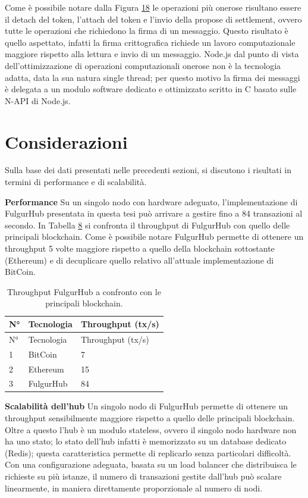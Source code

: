 \documentclass[12pt,italian,]{book}
\begin{document}
Come è possibile notare dalla Figura \protect\hyperlink{profiling-offchain}{18} le operazioni più onerose risultano essere il detach del token, l'attach del token e l'invio della propose di settlement, ovvero tutte le operazioni che richiedono la firma di un messaggio. Questo risultato è quello aspettato, infatti la firma crittografica richiede un lavoro computazionale maggiore rispetto alla lettura e invio di un messaggio. Node.js dal punto di vista dell'ottimizzazione di operazioni computazionali onerose non è la tecnologia adatta, data la sua natura single thread; per questo motivo la firma dei messaggi è delegata a un modulo software dedicato e ottimizzato scritto in C basato sulle N-API di Node.js.

\hypertarget{considerazioni}{%
\section{Considerazioni}\label{considerazioni}}

Sulla base dei dati presentati nelle precedenti sezioni, si discutono i risultati in termini di performance e di scalabilità.

\textbf{\textbf{Performance}} Su un singolo nodo con hardware adeguato, l'implementazione di FulgurHub presentata in questa tesi può arrivare a gestire fino a 84 transazioni al secondo. In Tabella \protect\hyperlink{fulgurhub_confronto}{8} si confronta il throughput di FulgurHub con quello delle principali blockchain. Come è possibile notare FulgurHub permette di ottenere un throughput 5 volte maggiore rispetto a quello della blockchain sottostante (Ethereum) e di decuplicare quello relativo all'attuale implementazione di BitCoin.

\begin{longtable}[]{@{}lll@{}}
\caption{\protect\hypertarget{fulgurhub_confronto}{}{}Throughput FulgurHub a confronto con le principali blockchain.}\tabularnewline
\toprule
N° & Tecnologia & Throughput (tx/s)\tabularnewline
\midrule
\endfirsthead
\toprule
N° & Tecnologia & Throughput (tx/s)\tabularnewline
\midrule
\endhead
1 & BitCoin & 7\tabularnewline
2 & Ethereum & 15\tabularnewline
3 & FulgurHub & 84\tabularnewline
\bottomrule
\end{longtable}

\textbf{\textbf{Scalabilità dell'hub}} Un singolo nodo di FulgurHub permette di ottenere un throughput sensibilmente maggiore rispetto a quello delle principali blockchain. Oltre a questo l'hub è un modulo stateless, ovvero il singolo nodo hardware non ha uno stato; lo stato dell'hub infatti è memorizzato su un database dedicato (Redis); questa caratteristica permette di replicarlo senza particolari difficoltà. Con una configurazione adeguata, basata su un load balancer che distribuisca le richieste su più istanze, il numero di transazioni gestite dall'hub può scalare linearmente, in maniera direttamente proporzionale al numero di nodi.
\end{document}
